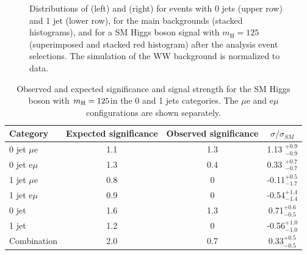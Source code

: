 \begin{figure}
{}
\caption{Distributions of \mll (left) and \mt (right) for events with 0 jets (upper row) and 1 jet (lower row), for the main backgrounds (stacked histograms), and for a SM Higgs boson signal with $m_\mathrm{H}=125$\GeV (superimposed and stacked red histogram) after the analysis event selections. The simulation of the WW background is normalized to data.}\label{fig:mllandmt}
\end{figure}

\begin{table}[htb]
\caption{Observed and expected significance and signal strength for the SM Higgs boson with $m_{\rm H}=125$\GeV in the 0 and 1 jets categories. The $\mu$e and e$\mu$ configurations are shown separately.}\label{tab:13TeVsignif}
\begin{center}
\begin{tabular}{lccc}
\toprule
Category  &  Expected significance      &  Observed  significance    &  $\sigma/\sigma_{SM}$     \\
\midrule
0 jet  $\mu$e   &     1.1        &  1.3        &  1.13 $_{-0.9}^{+0.9}$             \\ [5pt]   

0 jet  e$\mu$   &     1.3        &  0.4        &  0.33 $_{-0.7}^{+0.7}$             \\ [5pt]   

1 jet  $\mu$e   &     0.8        &  0          &  -0.11$_{-1.7}^{+0.5}$                 \\ [5pt] 

1 jet  e$\mu$   &     0.9        &  0          &  -0.54$_{-1.4}^{+1.4}$                 \\ [5pt] 

\midrule 

0 jet           &     1.6        &  1.3       &  0.71$_{-0.5}^{+0.6}$             \\ [5pt]  

1 jet           &     1.2        &  0         &  -0.56$_{-1.0}^{+1.0}$                \\ [5pt]  

\midrule 
Combination     &     2.0        &  0.7       &  0.33$_{-0.5}^{+0.5}$              \\ [5pt]  
\bottomrule
\end{tabular}
\end{center}
\end{table}


